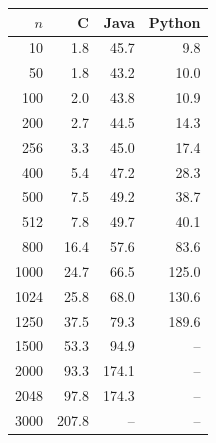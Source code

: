 \begin{tabular}{rrrr}
\toprule
$n$ & C & Java & Python \\
\midrule
10 & 1.8 & 45.7 & 9.8 \\
50 & 1.8 & 43.2 & 10.0 \\
100 & 2.0 & 43.8 & 10.9 \\
200 & 2.7 & 44.5 & 14.3 \\
256 & 3.3 & 45.0 & 17.4 \\
400 & 5.4 & 47.2 & 28.3 \\
500 & 7.5 & 49.2 & 38.7 \\
512 & 7.8 & 49.7 & 40.1 \\
800 & 16.4 & 57.6 & 83.6 \\
1000 & 24.7 & 66.5 & 125.0 \\
1024 & 25.8 & 68.0 & 130.6 \\
1250 & 37.5 & 79.3 & 189.6 \\
1500 & 53.3 & 94.9 & -- \\
2000 & 93.3 & 174.1 & -- \\
2048 & 97.8 & 174.3 & -- \\
3000 & 207.8 & -- & -- \\
\bottomrule
\end{tabular}
